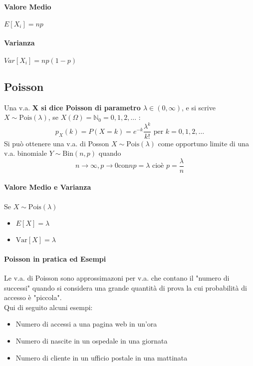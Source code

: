\paragraph*{Valore Medio} $E[X_i] = np$ 
\paragraph*{Varianza} $Var[X_i]=np(1-p)$

\subsection*{Poisson}
Una v.a. \textbf{X si dice Poisson di parametro $\lambda \in (0, \infty)$}, e si
scrive $X \sim \text{Pois}(\lambda)$, se $X(\Omega) = \mathbb{N}_0 = {0,1,2,\dots}$ :
\begin{equation*}
    p_X (k) = P(X=k) = e^{-k} \frac{\lambda^k}{k!} \text{ per } k = 0,1,2,\dots
\end{equation*}
Si può ottenere una v.a. di Posson $X \sim \text{Pois}(\lambda)$ come opportuno limite
di una v.a. binomiale $Y \sim \text{Bin}(n,p)$ quando
\begin{equation*}
    n \rightarrow \infty, p \rightarrow 0 \text{con} np=\lambda \text{ cioè } p = \frac{\lambda}{n}
\end{equation*}
\paragraph*{Valore Medio e Varianza}
Se $X \sim \text{Pois}(\lambda)$
\begin{itemize}
    \item $E[X] = \lambda$
    \item $\text{Var}[X] = \lambda$
\end{itemize}

\paragraph*{Poisson in pratica ed Esempi}
Le v.a. di Poisson sono approssimazoni per v.a. che contano il "numero di successi"
quando si considera una grande quantità di prova la cui probabilità di accesso è "piccola".
\\ Qui di seguito alcuni esempi: 
\begin{itemize}
    \item Numero di accessi a una pagina web in un'ora
    \item Numero di nascite in un ospedale in una giornata
    \item Numero di cliente in un ufficio postale in una mattinata
\end{itemize}


